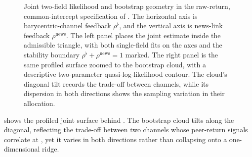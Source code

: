 \begin{figure}[htbp]
  \centering
  \caption{Joint two-field likelihood and bootstrap geometry in the raw-return,
    common-intercept specification of . The horizontal
    axis is barycentric-channel feedback $\rho^\flat$, and the vertical axis is
    news-link feedback $\rho^{\mathrm{news}}$. The left panel places the joint estimate
    inside the admissible triangle, with both single-field fits on the axes and
    the stability boundary $\rho^\flat+\rho^{\mathrm{news}}=1$ marked. The
    right panel is the same
    profiled surface zoomed to the bootstrap cloud, with a descriptive
    two-parameter quasi-log-likelihood contour. The cloud's diagonal
    tilt records
    the trade-off between channels, while its dispersion in both directions
  shows the sampling variation in their allocation.}
  \label{fig:two-field-region}
\end{figure}

 shows the profiled joint surface behind
.
The bootstrap cloud tilts along the diagonal, reflecting the trade-off between
two channels whose peer-return signals correlate at
, yet it varies in both directions rather
than collapsing onto a one-dimensional ridge.

